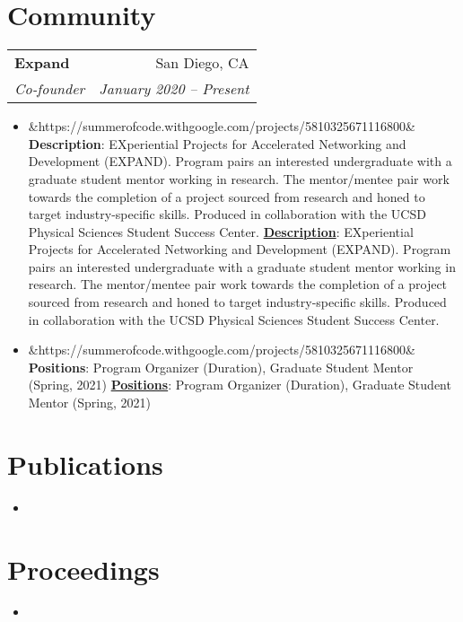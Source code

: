 \documentclass[letterpaper,11pt]{article}
\makeatletter
\newcommand{\Item}[3]{
  \item\small{
    \ifx&#1&
      \textbf{#2}{: #3 \vspace{-2pt}}
    \else
      \textbf{\href{#1}{#2}}{: #3 \vspace{-2pt}}
    \fi
  }
}
\newcommand{\Subheading}[4]{
  \vspace{-1pt}\item
    \begin{tabular*}{0.97\textwidth}{l@{\extracolsep{\fill}}r}
      \textbf{#1} & #2 \\
      \textit{\small#3} & \textit{\small #4} \\
    \end{tabular*}\vspace{-5pt}
}
\newcommand{\Section}[2]{
    \section{\texorpdfstring{#1}{o} #2}
}
\newcommand{\SubHeadingListStart}{\begin{description}[leftmargin=*]}
\newcommand{\SubHeadingListEnd}{\end{description}}
\newcommand{\ItemListStart}{\begin{itemize}}
\newcommand{\ItemListEnd}{\end{itemize}\vspace{-5pt}}
\makeatother
\begin{document}

\Section{\faGroup}{Community}
  \SubHeadingListStart
      \Subheading
      {Expand}{San Diego, CA}
      {Co-founder}{January 2020 -- Present}
      \ItemListStart
        \Item{https://summerofcode.withgoogle.com/projects/5810325671116800}{Description}
          {EXperiential Projects for Accelerated Networking and Development (EXPAND).  Program pairs an interested undergraduate with a graduate student mentor working in research. The mentor/mentee pair work towards the completion of a project sourced from research and honed to target industry-specific skills. Produced in collaboration with the UCSD Physical Sciences Student Success Center.}
        \Item{https://summerofcode.withgoogle.com/projects/5810325671116800}{Positions}
            {Program Organizer (Duration), Graduate Student Mentor (Spring, 2021)}
      \ItemListEnd
  \SubHeadingListEnd
%

\Section{\faPencilSquareO}{Publications}
  \begin{itemize}
      \item {}
  \end{itemize}

\Section{\faArchive}{Proceedings}
  \begin{itemize}
      \item {}
  \end{itemize}
  
\end{document}
